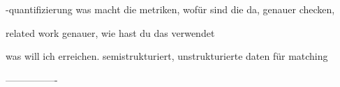 \documentclass[a4paper,12pt]{scrreprt}
\begin{document}
\pagestyle{empty}




\pagestyle{fancy}
\tableofcontents
\newpage

\newpage

\setcounter{page}{1}
\pagestyle{fancy}
\setcounter{chapter}{0}
\newpage






-quantifizierung
was macht die metriken, wofür sind die da,
genauer checken,


related work genauer, wie hast du das verwendet

was will ich erreichen. semistrukturiert, unstrukturierte daten für matching


----------------

\cite{said2013evaluating}

\cite{lerche2017implizites}

\cite{silveira2019good}
\end{document}
